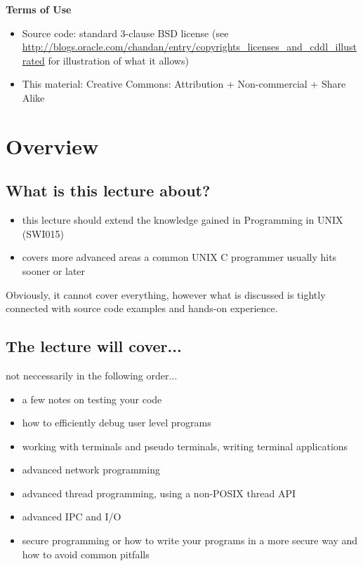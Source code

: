 {\large\bf Terms of Use}

\begin{itemize}
\item Source code: standard 3-clause BSD license (see
\url{http://blogs.oracle.com/chandan/entry/copyrights\_licenses\_and\_cddl\_illustrated}
for illustration of what it allows)
\item This material: Creative Commons: Attribution + Non-commercial + Share Alike
\end{itemize}


\section{Overview}

\subsection{What is this lecture about?}

\begin{itemize}
  \item this lecture should extend the knowledge gained in Programming in UNIX
  (SWI015)
  \item covers more advanced areas a common UNIX C programmer usually hits
  sooner or later
\end{itemize}

Obviously, it cannot cover everything, however what is discussed is tightly
connected with source code examples and hands-on experience.

\subsection{The lecture will cover...}

not neccessarily in the following order...

\begin{itemize}
  \item a few notes on testing your code
  \item how to efficiently debug user level programs
  \item working with terminals and pseudo terminals, writing terminal
  applications
  \item advanced network programming
  \item advanced thread programming, using a non-POSIX thread API
  \item advanced IPC and I/O
  \item secure programming or how to write your programs in a more secure way
  and how to avoid common pitfalls
\end{itemize}


